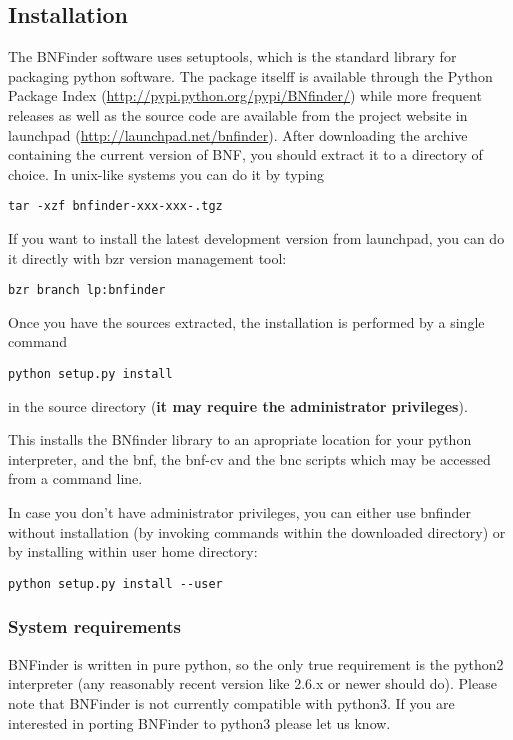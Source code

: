 
\subsection{Installation}

The BNFinder software uses setuptools, which is the standard library for
packaging python software. The package itselff is available through the Python Package Index (\url{http://pypi.python.org/pypi/BNfinder/}) while more frequent releases as well as the source code are available from the project website in launchpad (\url{http://launchpad.net/bnfinder}). After downloading the archive containing the current version of BNF, you should extract it to a directory of
choice. In unix-like systems you can do it by  typing
\begin{verbatim}
tar -xzf bnfinder-xxx-xxx-.tgz
\end{verbatim}

If you want to install the latest development version from launchpad, you can do it directly with bzr version management tool:

\begin{verbatim}
bzr branch lp:bnfinder
\end{verbatim}

Once you have the sources extracted, the installation is performed by
a single command
\begin{verbatim}
python setup.py install
\end{verbatim}
in the source directory (\textbf{it may require the administrator privileges}).

This installs the BNfinder library to an apropriate location for your
python interpreter, and the bnf, the bnf-cv and the bnc scripts which may be accessed from a
command line.

In case you don't have administrator privileges, you can either use bnfinder without installation (by invoking commands within the downloaded directory) or by installing within user home directory:

\begin{verbatim}
python setup.py install --user
\end{verbatim}

\subsubsection{System requirements}
\label{sec:req}

BNFinder is written in pure python, so the only true requirement is the python2 interpreter (any reasonably recent version like 2.6.x or newer should do). Please note that BNFinder is not currently compatible with python3. If you are interested in porting BNFinder to python3 please let us know. 

